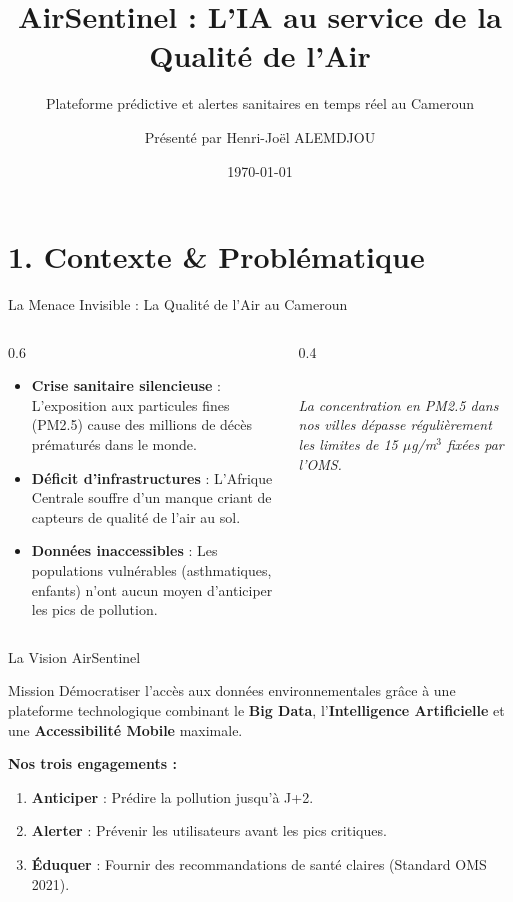 \documentclass[10pt, aspectratio=169]{beamer}
\title{AirSentinel : L'IA au service de la Qualité de l'Air}
\subtitle{Plateforme prédictive et alertes sanitaires en temps réel au Cameroun}
\author{Présenté par Henri-Joël ALEMDJOU}
\date{\today}
\institute{Compétition Tech Innovation}
\begin{document}
\begin{frame}
  \titlepage
\end{frame}

\section{1. Contexte \& Problématique}
\begin{frame}{La Menace Invisible : La Qualité de l'Air au Cameroun}
  \begin{columns}
    \begin{column}{0.6\textwidth}
      \begin{itemize}
        \item \textbf{Crise sanitaire silencieuse} : L'exposition aux particules fines (PM2.5) cause des millions de décès prématurés dans le monde.
        \item \textbf{Déficit d'infrastructures} : L'Afrique Centrale souffre d'un manque criant de capteurs de qualité de l'air au sol.
        \item \textbf{Données inaccessibles} : Les populations vulnérables (asthmatiques, enfants) n'ont aucun moyen d'anticiper les pics de pollution.
      \end{itemize}
    \end{column}
    \begin{column}{0.4\textwidth}
      \begin{center}
        \textcolor{red}{\faExclamationTriangle[regular]} \\
        \vspace{0.3cm}
        \textit{La concentration en PM2.5 dans nos villes dépasse régulièrement les limites de 15 $\mu$g/m$^3$ fixées par l'OMS.}
      \end{center}
    \end{column}
  \end{columns}
\end{frame}

\begin{frame}{La Vision AirSentinel}
  \begin{block}{Mission}
    Démocratiser l'accès aux données environnementales grâce à une plateforme technologique combinant le \textbf{Big Data}, l'\textbf{Intelligence Artificielle} et une \textbf{Accessibilité Mobile} maximale.
  \end{block}
  \vspace{0.5cm}
  \textbf{Nos trois engagements :}
  \begin{enumerate}
    \item \textbf{Anticiper} : Prédire la pollution jusqu'à J+2.
    \item \textbf{Alerter} : Prévenir les utilisateurs avant les pics critiques.
    \item \textbf{Éduquer} : Fournir des recommandations de santé claires (Standard OMS 2021).
  \end{enumerate}
\end{frame}
\end{document}
